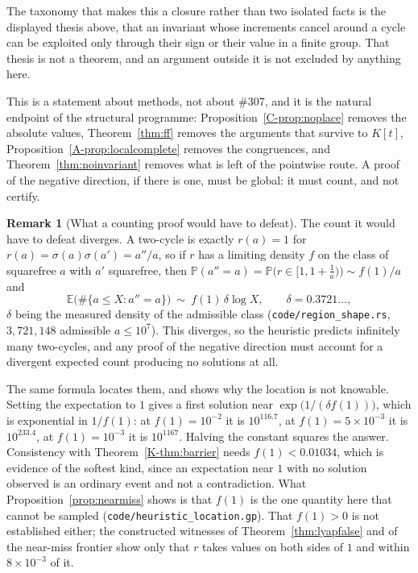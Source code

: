 \documentclass[11pt]{article}
\theoremstyle{definition}
\newtheorem{remark}[theorem]{Remark}
\begin{document}
The taxonomy that makes this a closure rather than two isolated facts is the displayed thesis above,
that an invariant whose increments cancel around a cycle can be exploited only through their sign or
their value in a finite group. That thesis is not a theorem, and an argument outside it is not
excluded by anything here.

This is a statement about methods, not about \#307, and it is the natural endpoint of the structural
programme: Proposition~\ref{C-prop:noplace} removes the absolute values, Theorem~\ref{thm:ff} removes
the arguments that survive to $K[t]$, Proposition~\ref{A-prop:localcomplete} removes the congruences,
and Theorem~\ref{thm:noinvariant} removes what is left of the pointwise route. A proof of the
negative direction, if there is one, must be global: it must count, and not certify.

\begin{remark}[What a counting proof would have to defeat]\label{rem:whatcounting}
The count it would have to defeat diverges. A two-cycle is exactly $r(a)=1$ for
$r(a)=\sigma(a)\sigma(a')=a''/a$, so if $r$ has a limiting density $f$ on the class of squarefree $a$
with $a'$ squarefree, then $\mathbb{P}(a''=a)=\mathbb{P}\bigl(r\in[1,1+\tfrac1a)\bigr)\sim f(1)/a$ and
\[ \mathbb{E}\bigl(\#\{a\le X:a''=a\}\bigr)\ \sim\ f(1)\,\delta\log X,\qquad \delta=0.3721\ldots, \]
$\delta$ being the measured density of the admissible class \textup{(\texttt{code/region\_shape.rs},
$3{,}721{,}148$ admissible $a\le10^7$)}. This diverges, so the heuristic predicts infinitely many
two-cycles, and any proof of the negative direction must account for a divergent expected count
producing no solutions at all.

The same formula locates them, and shows why the location is not knowable. Setting the expectation to
$1$ gives a first solution near $\exp\bigl(1/(\delta f(1))\bigr)$, which is exponential in $1/f(1)$:
at $f(1)=10^{-2}$ it is $10^{116.7}$, at $f(1)=5\times10^{-3}$ it is $10^{233.4}$, at $f(1)=10^{-3}$
it is $10^{1167}$. Halving the constant squares the answer. Consistency with
Theorem~\ref{K-thm:barrier} needs $f(1)<0.01034$, which is evidence of the softest kind, since an
expectation near $1$ with no solution observed is an ordinary event and not a contradiction. What
Proposition~\ref{prop:nearmiss} shows is that $f(1)$ is the one quantity here that cannot be sampled
\textup{(\texttt{code/heuristic\_location.gp})}. That $f(1)>0$ is not established either; the
constructed witnesses of Theorem~\ref{thm:lyapfalse} and of the near-miss frontier show only that $r$
takes values on both sides of $1$ and within $8\times10^{-3}$ of it.
\end{remark}
\end{document}
